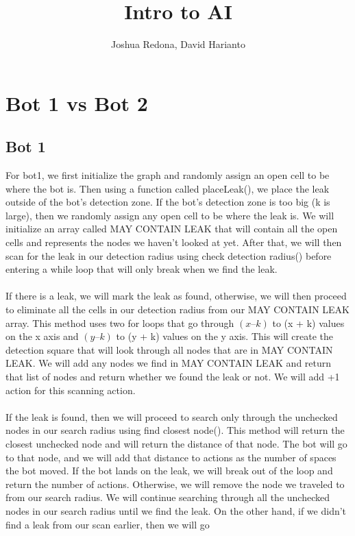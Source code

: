 \documentclass[12pt]{article}
\title{Intro to AI}
\author{Joshua Redona, David Harianto}
\begin{document}
\maketitle
\section*{Bot 1 vs Bot 2}
\subsection*{Bot 1}
For bot1, we first initialize the graph and randomly assign an open cell to
be where the bot is. Then using a function called placeLeak(), we place the 
leak outside of the bot's detection zone. If the bot's detection zone is too big 
(k is large), then we randomly assign any open cell to be where the leak is. 
We will initialize an array called MAY CONTAIN LEAK that will contain all the
open cells and represents the nodes we haven't looked at yet. After that, we will 
then scan for the leak in our detection radius using check detection radius() 
before entering a while loop that will only break when we find the leak. 
\\
\\
If there is a leak, we will mark the leak as found, otherwise, we will then 
proceed to eliminate all the cells in our detection radius from our 
MAY CONTAIN LEAK array. This method uses two for loops that go through
$(x – k)$ to (x + k) values on the x axis and $(y – k)$ to (y + k) values on the y axis.
This will create the detection square that will look through all 
nodes that are in MAY CONTAIN LEAK. We will add any nodes we find in
MAY CONTAIN LEAK and return that list of nodes and return whether we 
found the leak or not. We will add +1 action for this scanning action. 
\\
\\
If the leak is found, then we will proceed to search only through the unchecked 
nodes in our search radius using find closest node(). This method will return the 
closest unchecked node and will return the distance of that node. The bot will go 
to that node, and we will add that distance to actions as the number of spaces the bot moved. 
If the bot lands on the leak, we will break out of the loop and return the number of actions. 
Otherwise, we will remove the node we traveled to from our search radius. We will 
continue searching through all the unchecked nodes in our search radius until we find the leak. 
On the other hand, if we didn't find a leak from our scan earlier, then we will go 
\end{document}
